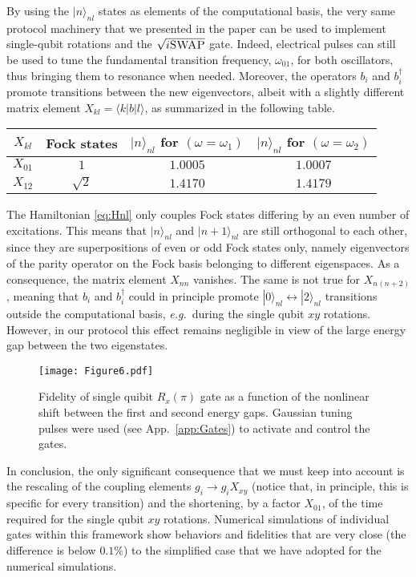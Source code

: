 \documentclass[aps,twocolumn,groupedaddress,superscriptaddress,floatfix,amsmath,amssymb,prb]{revtex4-1}
\begin{document}
\noindent By using the $|n\rangle_{nl}$ states as elements of the computational basis, the very same protocol machinery that we presented in the paper can be used to implement single-qubit rotations and the $\sqrt{i\text{\textsc{SWAP}}}$ gate. Indeed, electrical pulses can still be used to tune the fundamental transition frequency, $\omega_{01}$, for both oscillators, thus bringing them to resonance when needed. Moreover, the operators $b_i$ and $b_i^\dagger$ promote transitions between the new eigenvectors, albeit with a slightly different matrix element $X_{kl} = \langle k | b |l\rangle$, as summarized in the following table.

\begin{table}[!h]
\centering
\begin{tabular}{|c|c|c|c|}
\hline
$X_{kl}$ & Fock states & $|n\rangle_{nl}$ for $(\omega = \omega_1)$ & $|n\rangle_{nl}$ for $(\omega = \omega_2)$ \\ 
\hline
$X_{01}$ & $1$ & $1.0005$ & $1.0007$ \\  
$X_{12}$ & $\sqrt{2}$ & $1.4170$ & $1.4179$ \\ 
\hline
\end{tabular}
\end{table}

\noindent The Hamiltonian \eqref{eq:Hnl} only couples Fock states differing by an even number of excitations. This means that $|n\rangle_{nl}$ and $|n+1\rangle_{nl}$ are still orthogonal to each other, since they are superpositions of even or odd Fock states only, namely eigenvectors of the parity operator on the Fock basis belonging to different eigenspaces. As a consequence, the matrix element $X_{nn}$ vanishes. The same is not true for $X_{n(n+2)}$, meaning that $b_i$ and $b_i^\dagger$ could in principle promote $|0\rangle_{nl}\leftrightarrow |2\rangle_{nl}$ transitions outside the computational basis, \textit{e.g.}\ during the single qubit $xy$ rotations. However, in our protocol this effect remains negligible in view of the large energy gap between the two eigenstates. 

\begin{figure}[b]
\centering
\texttt{[image: Figure6.pdf]}
\caption{Fidelity of single quibit $R_x(\pi)$ gate as a function of the nonlinear shift between the first and second energy gaps. Gaussian tuning pulses were used (see App.~\ref{app:Gates}) to activate and control the gates.}
\label{fig:RxVsU}
\end{figure}

In conclusion, the only significant consequence that we must keep into account is the rescaling of the coupling elements $g_i \rightarrow g_i X_{xy}$ (notice that, in principle, this is specific for every transition) and the shortening, by a factor $X_{01}$, of the time required for the single qubit $xy$ rotations. Numerical simulations of individual gates within this framework show behaviors and fidelities that are very close (the difference is below $0.1\%$) to the simplified case that we have adopted for the numerical simulations. \\
\end{document}
